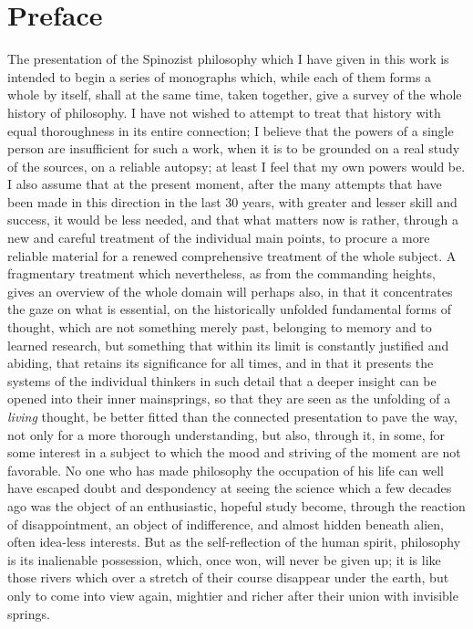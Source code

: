 \documentclass[12pt,a4paper,openany]{book}
\newcommand{\opage}[1]{\marginnote{\footnotesize\textit{[#1]}}}
\begin{document}
\newpage

\chapter*{Preface}

\opage{1}The presentation of the Spinozist philosophy which I have given in
this work is intended to begin a series of monographs which, while
each of them forms a whole by itself, shall at the same time, taken
together, give a survey of the whole history of philosophy. I have not
wished to attempt to treat that history with equal thoroughness in its
entire connection; I believe that the powers of a single person are
insufficient for such a work, when it is to be grounded on a real study
of the sources, on a reliable autopsy; at least I feel that my own
powers would be. I also assume that at the present moment, after the many
attempts that have been made in this direction in the last 30 years,
with greater and lesser skill and success, it would be less needed,
and that what matters now is rather, through a new and careful treatment
of the individual main points, to procure a more reliable material for
a renewed comprehensive treatment of the whole subject. A fragmentary
treatment which nevertheless, as from the commanding heights, gives an
overview of the whole domain will perhaps also, in that it concentrates
the gaze on what is essential, on the historically unfolded fundamental
forms of thought, which are not something merely past, belonging to
memory and to learned research, but something that within its limit is
constantly justified and abiding, that retains its significance for all
times, and in that it presents the systems of the individual thinkers
in such
\opage{2}detail that a deeper insight can be opened into
their inner mainsprings, so that they are seen as the unfolding of a
\emph{living} thought, be better fitted than the connected presentation
to pave the way, not only for a more thorough understanding, but also,
through it, in some, for some interest in a subject to which the mood and
striving of the moment are not favorable. No one who has made
philosophy the occupation of his life can well have escaped doubt and
despondency at seeing the science which a few decades ago was the
object of an enthusiastic, hopeful study become, through the reaction
of disappointment, an object of indifference, and almost hidden beneath
alien, often idea-less interests. But as the self-reflection of the
human spirit, philosophy is its inalienable possession, which, once
won, will never be given up; it is like those rivers which over a
stretch of their course disappear under the earth, but only to come
into view again, mightier and richer after their union with invisible
springs.
\end{document}
